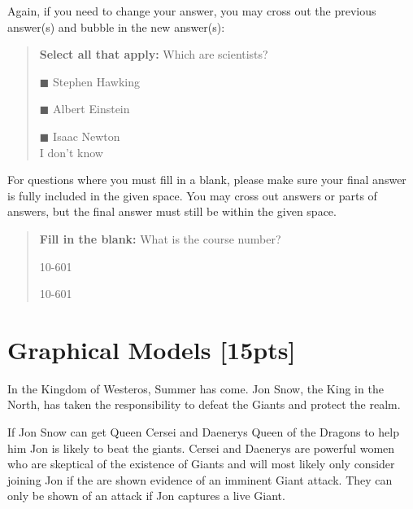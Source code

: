 \documentclass[12pt]{article}
\begin{document}
Again, if you need to change your answer, you may cross out the previous answer(s) and bubble in the new answer(s):

\begin{quote}
\textbf{Select all that apply:} Which are scientists?
    \begin{list}{}
    \item $\blacksquare$ Stephen Hawking 
    \item $\blacksquare$ Albert Einstein
    \item $\blacksquare$ Isaac Newton\\
    \xcancel{$\blacksquare$} I don't know
\end{list}
\end{quote}

For questions where you must fill in a blank, please make sure your final answer is fully included in the given space. You may cross out answers or parts of answers, but the final answer must still be within the given space.

\begin{quote}
\textbf{Fill in the blank:} What is the course number?

\begin{tcolorbox}[fit,height=1cm, width=4cm, blank, borderline={1pt}{-2pt},nobeforeafter]
    \begin{center}\huge10-601\end{center}
    \end{tcolorbox}\hspace{2cm}
    \begin{tcolorbox}[fit,height=1cm, width=4cm, blank, borderline={1pt}{-2pt},nobeforeafter]
    \begin{center}\huge10-601\end{center}
    \end{tcolorbox}
\end{quote}
\clearpage

\section{Graphical Models [15pts]}

In the Kingdom of Westeros, Summer has come. Jon Snow, the King in the North, has taken the responsibility to defeat the Giants and protect the realm.

If Jon Snow can get Queen Cersei and Daenerys Queen of the Dragons to help him Jon is likely to beat the giants. Cersei and Daenerys are powerful women who are skeptical of the existence of Giants and will most likely only consider joining Jon if the are shown evidence of an imminent Giant attack. They can only be shown of an attack if Jon captures a live Giant.
\end{document}
